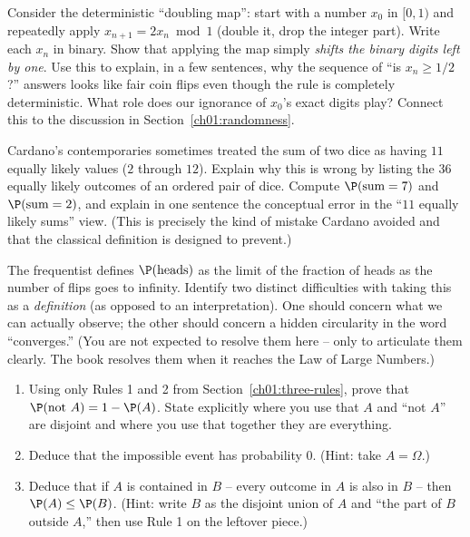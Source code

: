 \begin{exercise}
\label{ch01:ex-doubling}
Consider the deterministic ``doubling map'': start with a number $x_0$ in $[0,1)$
and repeatedly apply $x_{n+1} = 2x_n \bmod 1$ (double it, drop the integer part).
Write each $x_n$ in binary. Show that applying the map simply \emph{shifts the
binary digits left by one}. Use this to explain, in a few sentences, why the
sequence of ``is $x_n \ge 1/2$?'' answers looks like fair coin flips even though the
rule is completely deterministic. What role does our ignorance of $x_0$'s exact
digits play? Connect this to the discussion in Section~\ref{ch01:randomness}.
\end{exercise}

\begin{exercise}
\label{ch01:ex-two-dice}
Cardano's contemporaries sometimes treated the sum of two dice as having $11$
equally likely values ($2$ through $12$). Explain why this is wrong by listing the
$36$ equally likely outcomes of an ordered pair of dice. Compute $\P(\text{sum}=7)$
and $\P(\text{sum}=2)$, and explain in one sentence the conceptual error in the
``$11$ equally likely sums'' view. (This is precisely the kind of mistake Cardano
avoided and that the classical definition is designed to prevent.)
\end{exercise}

\begin{exercise}
\label{ch01:ex-infinity}
The frequentist defines $\P(\text{heads})$ as the limit of the fraction of heads as
the number of flips goes to infinity. Identify two distinct difficulties with
taking this as a \emph{definition} (as opposed to an interpretation). One should
concern what we can actually observe; the other should concern a hidden circularity
in the word ``converges.'' (You are not expected to resolve them here -- only to
articulate them clearly. The book resolves them when it reaches the Law of Large
Numbers.)
\end{exercise}

\begin{exercise}
\label{ch01:ex-proof}
\begin{enumerate}
\item Using only Rules 1 and 2 from Section~\ref{ch01:three-rules}, prove that
$\P(\text{not } A) = 1 - \P(A)$. State explicitly where you use that $A$ and
``not $A$'' are disjoint and where you use that together they are everything.
\item Deduce that the impossible event has probability $0$. (Hint: take $A = \Omega$.)
\item Deduce that if $A$ is contained in $B$ -- every outcome in $A$ is also in $B$
-- then $\P(A) \le \P(B)$. (Hint: write $B$ as the disjoint union of $A$ and ``the
part of $B$ outside $A$,'' then use Rule 1 on the leftover piece.)
\end{enumerate}
\end{exercise}
